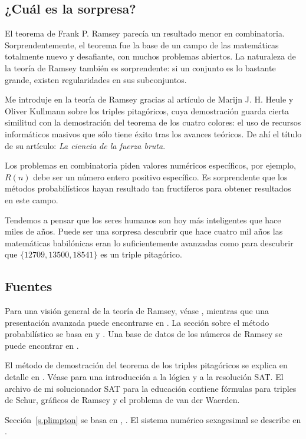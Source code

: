 
\subsection*{¿Cuál es la sorpresa?}

El teorema de Frank P. Ramsey  parecía un resultado menor en combinatoria. Sorprendentemente, el teorema fue la base de un campo de las matemáticas totalmente nuevo y desafiante, con muchos problemas abiertos. La naturaleza de la teoría de Ramsey también es sorprendente: si un conjunto es lo bastante grande, existen regularidades en sus subconjuntos.

Me introduje en la teoría de Ramsey gracias al artículo de Marijn J. H. Heule y Oliver Kullmann sobre los triples pitagóricos, cuya demostración guarda cierta similitud con la demostración del teorema de los cuatro colores: el uso de recursos informáticos masivos que sólo tiene éxito tras los avances teóricos. De ahí el título de su artículo: \textit{La ciencia de la fuerza bruta}.

Los problemas en combinatoria piden valores numéricos específicos, por ejemplo, $R(n)$ debe ser un número entero positivo específico. Es sorprendente que los métodos probabilísticos hayan resultado tan fructíferos para obtener resultados en este campo.

Tendemos a pensar que los seres humanos son hoy más inteligentes que hace miles de años. Puede ser una sorpresa descubrir que hace cuatro mil años las matemáticas babilónicas eran lo suficientemente avanzadas como para descubrir que $\{12709, 13500, 18541\}$ es un triple pitagórico.

\subsection*{Fuentes}

Para una visión general de la teoría de Ramsey, véase \cite{burton}, mientras que una presentación avanzada puede encontrarse en \cite{rudiments}. La sección sobre el método probabilístico se basa en \cite[Ejemplo~4o]{ross} y \cite[Capítulo~4]{burton}. Una base de datos de los números de Ramsey se puede encontrar en \cite{mckay}.

El método de demostración del teorema de los triples pitagóricos se explica en detalle en \cite{brute}. Véase \cite{mlcs} para una introducción a la lógica y a la resolución SAT. El archivo de mi solucionador SAT para la educación \cite{joss} contiene fórmulas para triples de Schur, gráficos de Ramsey y el problema de van der Waerden. 

Sección~\ref{s.plimpton} se basa en \cite{wiki:plimpton}, \cite{robson}. 
El sistema numérico sexagesimal se describe en \cite{wiki:sexagesimal}.
